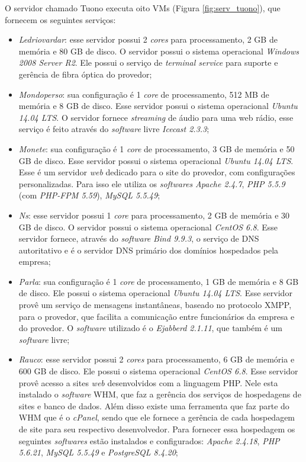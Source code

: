 O servidor chamado Tuono executa oito \ac{VM}s (Figura \ref{fig:serv_tuono}), que fornecem os seguintes serviços:
\begin{itemize}
 \item \textit{Ledriovardar}: esse servidor possui 2 \textit{cores} para processamento, 2 GB de memória e 80 GB de disco. O servidor possui 
 o sistema operacional \textit{Windows 2008 Server R2}. Ele possui o serviço de \textit{terminal service} para suporte e gerência de fibra 
 óptica do provedor;
 
 \item \textit{Mondoperso}: sua configuração é 1 \textit{core} de processamento, 512 MB de memória e 8 GB de disco. Esse servidor possui o 
 sistema operacional \textit{Ubuntu 14.04 \ac{LTS}}. O servidor fornece \textit{streaming} de áudio para uma web rádio, esse serviço é feito
 através do \textit{software} livre \textit{Icecast 2.3.3};
 
 \item \textit{Monete}: sua configuração é 1 \textit{core} de processamento, 3 GB de memória e 50 GB de disco. Esse servidor possui o 
 sistema operacional \textit{Ubuntu 14.04 \ac{LTS}}. Esse é um servidor \textit{web} dedicado para o site do provedor, com configurações
 personalizadas. Para isso ele utiliza os \textit{softwares} \textit{Apache 2.4.7}, \textit{\ac{PHP} 5.5.9} (com \textit{PHP-FPM 5.59}), 
 \textit{MySQL 5.5.49};
 
 \item \textit{Ns}: esse servidor possui 1 \textit{core} para processamento, 2 GB de memória e 30 GB de disco. O servidor possui 
 o sistema operacional \textit{CentOS 6.8}. Esse servidor fornece, através do \textit{software} \textit{Bind 9.9.3}, o serviço de \ac{DNS} 
 autoritativo e é o servidor \ac{DNS} primário dos domínios hospedados pela empresa;
 
 \item \textit{Parla}: sua configuração é 1 \textit{core} de processamento, 1 GB de memória e 8 GB de disco. Ele possui o sistema
 operacional \textit{Ubuntu 14.04 \ac{LTS}}. Esse servidor provê um serviço de mensagens instantâneas, baseado no protocolo \ac{XMPP}, para
 o provedor, que facilita a comunicação entre funcionários da empresa e do provedor. O \textit{software} utilizado é o \textit{Ejabberd 2.1.11},
 que também é um \textit{software} livre;
 
 \item \textit{Rauco}: esse servidor possui 2 \textit{cores} para processamento, 6 GB de memória e 600 GB de disco. Ele possui o sistema
 operacional \textit{CentOS 6.8}. Esse servidor provê acesso a sites \textit{web} desenvolvidos com a linguagem \ac{PHP}. Nele esta instalado o 
 \textit{software} \ac{WHM}, que faz a gerência dos serviços de hospedagens de sites e banco de dados. Além disso existe uma ferramenta que 
 faz parte do \ac{WHM} que é o \textit{cPanel}, sendo que ele fornece a gerência de cada hospedagem de site para seu respectivo desenvolvedor.
 Para fornecer essa hospedagem os seguintes \textit{softwares} estão instalados e configurados: \textit{Apache 2.4.18}, \textit{\ac{PHP} 5.6.21}, 
 \textit{MySQL 5.5.49} e \textit{PostgreSQL 8.4.20};
 

\end{itemize}
